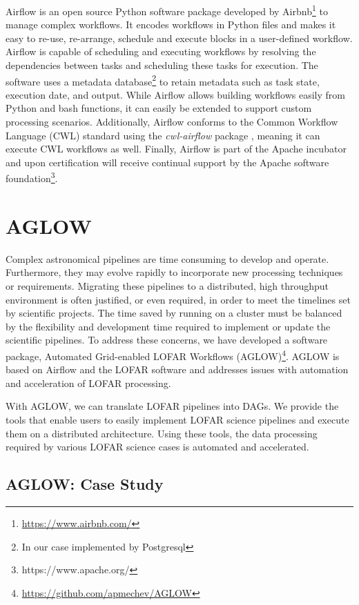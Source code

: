 Airflow is an open source Python software package developed by Airbnb\footnote{\url{https://www.airbnb.com/}} to manage complex workflows. It encodes workflows in Python files and makes it easy to re-use, re-arrange, schedule and execute blocks in a user-defined workflow. Airflow is capable of scheduling and executing workflows by resolving the dependencies between tasks and scheduling these tasks for execution. The software uses a metadata database\footnote{In our case implemented by Postgresql} to retain metadata such as task state, execution date, and output. While Airflow allows building workflows easily from Python and bash functions, it can easily be extended to support custom processing scenarios. Additionally, Airflow conforms to the Common Workflow Language (CWL) \cite{cwl} standard using the \textit{cwl-airflow} package \cite{cwlairflow}, meaning it can execute CWL workflows as well. Finally, Airflow is part of the Apache incubator and upon certification will receive continual support by the Apache software foundation\footnote{https://www.apache.org/}. 


\section{AGLOW}\label{sec:AGLOW}

Complex astronomical pipelines are time consuming to develop and operate. Furthermore, they may evolve rapidly to incorporate new processing techniques or requirements. Migrating these pipelines to a distributed, high throughput environment is often justified, or even required, in order to meet the timelines set by scientific projects. The time saved by running on a cluster must be balanced by the flexibility and development time required to implement or update the scientific pipelines. To address these concerns, we have developed a software package, Automated Grid-enabled LOFAR Workflows (AGLOW)\footnote{\url{https://github.com/apmechev/AGLOW}}. AGLOW is based on Airflow and the LOFAR software and addresses issues with automation and acceleration of LOFAR processing. 

With AGLOW, we can translate LOFAR pipelines into DAGs. We provide the tools that enable users to easily implement LOFAR science pipelines and execute them on a distributed architecture. Using these tools, the data processing required by various LOFAR science cases is automated and accelerated. 

\subsection{AGLOW: Case Study}

